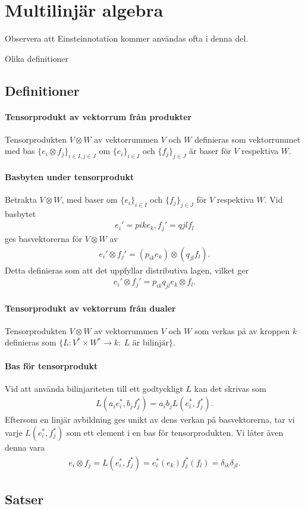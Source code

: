 \section{Multilinjär algebra}

Observera att Einsteinnotation kommer användas ofta i denna del.

Olika definitioner

\subsection{Definitioner}

\paragraph{Tensorprodukt av vektorrum från produkter}
Tensorprodukten $V\otimes W$ av vektorrummen $V$ och $W$ definieras som vektorrummet med bas $\{e_{i}\otimes f_{j}\}_{i\in I, j\in J}$ om $\{e_{i}\}_{i\in I}$ och $\{f_{j}\}_{j\in J}$ är baser för $V$ respektiva $W$.

\paragraph{Basbyten under tensorprodukt}
Betrakta $V\otimes W$, med baser om $\{e_{i}\}_{i\in I}$ och $\{f_{j}\}_{j\in J}$ för $V$ respektiva $W$. Vid basbytet
\begin{align*}
	e_{i}' = p{ik}e_{k}, f_{j}' = q{jl}f_{l}
\end{align*}
ges basvektorerna för $V\otimes W$ av
\begin{align*}
	e_{i}'\otimes f_{j}' = (p_{ik}e_{k})\otimes (q_{jl}f_{l}).
\end{align*}
Detta definieras som att det uppfyllar distributiva lagen, vilket ger
\begin{align*}
	e_{i}'\otimes f_{j}' = p_{ik}q_{jl}e_{k}\otimes f_{l}.
\end{align*}

\paragraph{Tensorprodukt av vektorrum från dualer}
Tensorprodukten $V\otimes W$ av vektorrummen $V$ och $W$ som verkas på av kroppen $k$ definieras som $\{L: V^{*}\times W^{*}\to k:\ L\text{ är bilinjär}\}$.

\paragraph{Bas för tensorprodukt}
Vid att använda bilinjariteten till ett godtyckligt $L$ kan det skrivas som
\begin{align*}
	L(a_{i}e_{i}^{*}, b_{j}f_{j}^{*}) = a_{i}b_{j}L(e_{i}^{*}, f_{j}^{*}).
\end{align*}
Eftersom en linjär avbildning ges unikt av dens verkan på basvektorerna, tar vi varje $L(e_{i}^{*}, f_{j}^{*})$ som ett element i en bas för tensorprodukten. Vi låter även denna vara
\begin{align*}
	e_{i}\otimes f_{j} = L(e_{i}^{*}, f_{j}^{*}) = e_{i}^{*}(e_{k})f_{j}^{*}(f_{l}) = \delta_{ik}\delta_{jl}.
\end{align*}

\subsection{Satser}